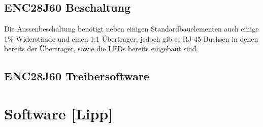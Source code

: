 \documentclass[a4paper,14pt,headsepline]{scrartcl}
\begin{document}
\subsection{ENC28J60 Beschaltung}
Die Aussenbeschaltung benötigt neben einigen Standardbauelementen auch einige 1\% Widerstände und einen 1:1 Übertrager, jedoch gib es RJ-45 Buchsen in denen bereits der Übertrager, sowie die LEDs bereits eingebaut sind.
\begin{figure}[h]
\begin{center}
\end{center}
\end{figure}



\subsection{ENC28J60 Treibersoftware}

\section{Software [Lipp]}

 
\end{document}
